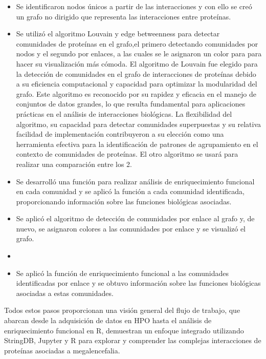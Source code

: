 \begin{itemize}
	\item Se identificaron nodos únicos a partir de las interacciones y con ello se creó un grafo no dirigido que representa las interacciones entre proteínas.
	\item Se utilizó el algoritmo Louvain y edge betweenness para detectar comunidades de proteínas en el grafo,el primero detectando comunidades por nodos y el segundo por enlaces, a las cuales se le asignaron un color para para hacer su visualización más cómoda. El algoritmo de Louvain fue elegido para la detección de comunidades en el grafo de interacciones de proteínas debido a su eficiencia computacional y capacidad para optimizar la modularidad del grafo. Este algoritmo es reconocido por su rapidez y eficacia en el manejo de conjuntos de datos grandes, lo que resulta fundamental para aplicaciones prácticas en el análisis de interacciones biológicas. La flexibilidad del algoritmo, su capacidad para detectar comunidades superpuestas y su relativa facilidad de implementación contribuyeron a su elección como una herramienta efectiva para la identificación de patrones de agrupamiento en el contexto de comunidades de proteínas. El otro algoritmo se usará para realizar una comparación entre los 2.
	\item Se desarrolló una función para realizar análisis de enriquecimiento funcional en cada comunidad y se aplicó la función a cada comunidad identificada, proporcionando información sobre las funciones biológicas asociadas.
	\item Se aplicó el algoritmo de detección de comunidades por enlace al grafo y, de nuevo, se asignaron colores a las comunidades por enlace y se visualizó el grafo.
	\item 
	\item Se aplicó la función de enriquecimiento funcional a las comunidades identificadas por enlace y se obtuvo información sobre las funciones biológicas asociadas a estas comunidades.
	
\end{itemize}
Todos estos pasos proporcionan una visión general del flujo de trabajo, que abarcan desde la adquisición de datos en HPO hasta el análisis de enriquecimiento funcional en R, demuestran un enfoque integrado utilizando StringDB, Jupyter y R para explorar y comprender las complejas interacciones de proteínas asociadas a megalencefalia.


